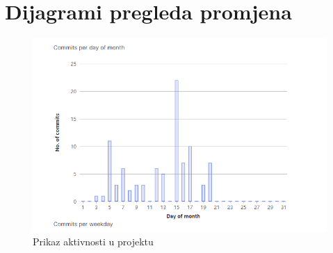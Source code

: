 	
					
					
		\eject
		\section*{Dijagrami pregleda promjena}
		\begin{figure}[H]
			\includegraphics[scale=0.7]{slike/commits.png}
			\centering
			\caption{Prikaz aktivnosti u projektu}
			\label{fig:promjene}
		          \end{figure}
		
		
	